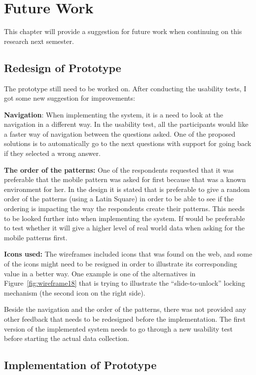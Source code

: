 \chapter{Future Work} \label{chap:FutureWork}

	This chapter will provide a suggestion for future work when continuing on this research next semester.

\section{Redesign of Prototype}
  
  The prototype still need to be worked on. After conducting the usability tests, I got some new suggestion for improvements:

  {\bf Navigation}: When implementing the system, it is a need to look at the navigation in a different way. In the usability test, all the participants would like a faster way of navigation between the questions asked. One of the proposed solutions is to automatically go to the next questions with support for going back if they selected a wrong answer.

  {\bf The order of the patterns:} One of the respondents requested that it was preferable that the mobile pattern was asked for first because that was a known environment for her. In the design it is stated that is preferable to give a random order of the patterns (using a Latin Square) in order to be able to see if the ordering is impacting the way the respondents create their patterns. This needs to be looked further into when implementing the system. If would be preferable to test whether it will give a higher level of real world data when asking for the mobile patterns first. 

  {\bf Icons used:} The wireframes included icons that was found on the web, and some of the icons might need to be resigned in order to illustrate its corresponding value in a better way. One example is one of the alternatives in Figure~\ref{fig:wireframe18} that is trying to illustrate the ``slide-to-unlock'' locking mechanism (the second icon on the right side).

  Beside the navigation and the order of the patterns, there was not provided any other feedback that needs to be redesigned before the implementation. The first version of the implemented system needs to go through a new usability test before starting the actual data collection. 

\section{Implementation of Prototype}

